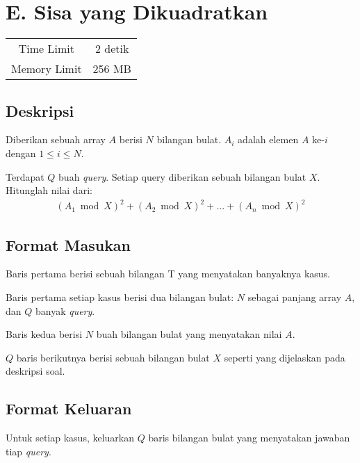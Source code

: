\documentclass{article}
\begin{document}
\section*{\hfil E. Sisa yang Dikuadratkan\hfil}

\begin{center}
\begin{tabular}{ |cc| } 
 \hline
 Time Limit & 2 detik \\ 
 Memory Limit & 256 MB \\
 \hline
\end{tabular}
\end{center}

\subsection*{Deskripsi}

\par Diberikan sebuah array $A$ berisi $N$ bilangan bulat. $A_{i}$ adalah elemen $A$ ke-$i$ dengan $1 \leq i \leq N$.

\par Terdapat $Q$ buah \textit{query}. Setiap query diberikan sebuah bilangan bulat $X$. Hitunglah nilai dari:
\begin{gather*} 
(A_{1} \bmod X)^2 + (A_{2} \bmod X)^2 + ... + (A_{n} \bmod X)^2
\end{gather*} 

\subsection*{Format Masukan}
\par Baris pertama berisi sebuah bilangan T yang menyatakan banyaknya kasus.
\par Baris pertama setiap kasus berisi dua bilangan bulat: $N$ sebagai panjang array $A$, dan $Q$ banyak \textit{query}.
\par Baris kedua berisi $N$ buah bilangan bulat yang menyatakan nilai $A$.
\par $Q$ baris berikutnya berisi sebuah bilangan bulat $X$ seperti yang dijelaskan pada deskripsi soal.

\subsection*{Format Keluaran}

\par Untuk setiap kasus, keluarkan $Q$ baris bilangan bulat yang menyatakan jawaban tiap \textit{query}.
\end{document}
